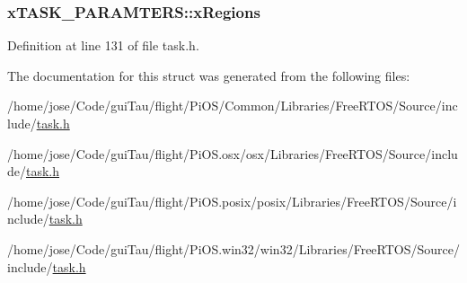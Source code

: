 \hypertarget{structx_t_a_s_k___p_a_r_a_m_t_e_r_s_ad3abcb257fabbc2ef6444c263a84d766}{
\subsubsection[{x\-Regions}]{ x\-T\-A\-S\-K\-\_\-\-P\-A\-R\-A\-M\-T\-E\-R\-S\-::x\-Regions}}\label{structx_t_a_s_k___p_a_r_a_m_t_e_r_s_ad3abcb257fabbc2ef6444c263a84d766}


Definition at line 131 of file task.\-h.



The documentation for this struct was generated from the following files\-:\begin{DoxyCompactItemize}
\item 
/home/jose/\-Code/gui\-Tau/flight/\-Pi\-O\-S/\-Common/\-Libraries/\-Free\-R\-T\-O\-S/\-Source/include/\hyperlink{_common_2_libraries_2_free_r_t_o_s_2_source_2include_2task_8h}{task.\-h}\item 
/home/jose/\-Code/gui\-Tau/flight/\-Pi\-O\-S.\-osx/osx/\-Libraries/\-Free\-R\-T\-O\-S/\-Source/include/\hyperlink{osx_2osx_2_libraries_2_free_r_t_o_s_2_source_2include_2task_8h}{task.\-h}\item 
/home/jose/\-Code/gui\-Tau/flight/\-Pi\-O\-S.\-posix/posix/\-Libraries/\-Free\-R\-T\-O\-S/\-Source/include/\hyperlink{posix_2posix_2_libraries_2_free_r_t_o_s_2_source_2include_2task_8h}{task.\-h}\item 
/home/jose/\-Code/gui\-Tau/flight/\-Pi\-O\-S.\-win32/win32/\-Libraries/\-Free\-R\-T\-O\-S/\-Source/include/\hyperlink{win32_2win32_2_libraries_2_free_r_t_o_s_2_source_2include_2task_8h}{task.\-h}\end{DoxyCompactItemize}
